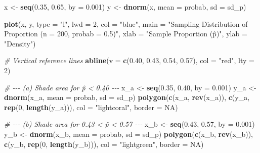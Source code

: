 \documentclass[
]{article}
\newenvironment{Shaded}{\begin{snugshade}}{\end{snugshade}}
\newcommand{\AttributeTok}[1]{\textcolor[rgb]{0.13,0.29,0.53}{#1}}
\newcommand{\CommentTok}[1]{\textcolor[rgb]{0.56,0.35,0.01}{\textit{#1}}}
\newcommand{\ConstantTok}[1]{\textcolor[rgb]{0.56,0.35,0.01}{#1}}
\newcommand{\DecValTok}[1]{\textcolor[rgb]{0.00,0.00,0.81}{#1}}
\newcommand{\FloatTok}[1]{\textcolor[rgb]{0.00,0.00,0.81}{#1}}
\newcommand{\FunctionTok}[1]{\textcolor[rgb]{0.13,0.29,0.53}{\textbf{#1}}}
\newcommand{\NormalTok}[1]{#1}
\newcommand{\OtherTok}[1]{\textcolor[rgb]{0.56,0.35,0.01}{#1}}
\newcommand{\StringTok}[1]{\textcolor[rgb]{0.31,0.60,0.02}{#1}}
\begin{document}
\begin{Shaded}
\begin{Highlighting}[]
\NormalTok{x }\OtherTok{\textless{}{-}} \FunctionTok{seq}\NormalTok{(}\FloatTok{0.35}\NormalTok{, }\FloatTok{0.65}\NormalTok{, }\AttributeTok{by =} \FloatTok{0.001}\NormalTok{)}
\NormalTok{y }\OtherTok{\textless{}{-}} \FunctionTok{dnorm}\NormalTok{(x, }\AttributeTok{mean =}\NormalTok{ probab, }\AttributeTok{sd =}\NormalTok{ sd\_p)}

\FunctionTok{plot}\NormalTok{(x, y, }\AttributeTok{type =} \StringTok{"l"}\NormalTok{, }\AttributeTok{lwd =} \DecValTok{2}\NormalTok{, }\AttributeTok{col =} \StringTok{"blue"}\NormalTok{,}
     \AttributeTok{main =} \StringTok{"Sampling Distribution of Proportion (n = 200, probab = 0.5)"}\NormalTok{,}
     \AttributeTok{xlab =} \StringTok{"Sample Proportion (p̂)"}\NormalTok{,}
     \AttributeTok{ylab =} \StringTok{"Density"}\NormalTok{)}

\CommentTok{\# Vertical reference lines}
\FunctionTok{abline}\NormalTok{(}\AttributeTok{v =} \FunctionTok{c}\NormalTok{(}\FloatTok{0.40}\NormalTok{, }\FloatTok{0.43}\NormalTok{, }\FloatTok{0.54}\NormalTok{, }\FloatTok{0.57}\NormalTok{), }\AttributeTok{col =} \StringTok{"red"}\NormalTok{, }\AttributeTok{lty =} \DecValTok{2}\NormalTok{)}

\CommentTok{\# {-}{-}{-} (a) Shade area for p̂ \textless{} 0.40 {-}{-}{-}}
\NormalTok{x\_a }\OtherTok{\textless{}{-}} \FunctionTok{seq}\NormalTok{(}\FloatTok{0.35}\NormalTok{, }\FloatTok{0.40}\NormalTok{, }\AttributeTok{by =} \FloatTok{0.001}\NormalTok{)}
\NormalTok{y\_a }\OtherTok{\textless{}{-}} \FunctionTok{dnorm}\NormalTok{(x\_a, }\AttributeTok{mean =}\NormalTok{ probab, }\AttributeTok{sd =}\NormalTok{ sd\_p)}
\FunctionTok{polygon}\NormalTok{(}\FunctionTok{c}\NormalTok{(x\_a, }\FunctionTok{rev}\NormalTok{(x\_a)), }\FunctionTok{c}\NormalTok{(y\_a, }\FunctionTok{rep}\NormalTok{(}\DecValTok{0}\NormalTok{, }\FunctionTok{length}\NormalTok{(y\_a))), }\AttributeTok{col =} \StringTok{"lightcoral"}\NormalTok{, }\AttributeTok{border =} \ConstantTok{NA}\NormalTok{)}

\CommentTok{\# {-}{-}{-} (b) Shade area for 0.43 \textless{} p̂ \textless{} 0.57 {-}{-}{-}}
\NormalTok{x\_b }\OtherTok{\textless{}{-}} \FunctionTok{seq}\NormalTok{(}\FloatTok{0.43}\NormalTok{, }\FloatTok{0.57}\NormalTok{, }\AttributeTok{by =} \FloatTok{0.001}\NormalTok{)}
\NormalTok{y\_b }\OtherTok{\textless{}{-}} \FunctionTok{dnorm}\NormalTok{(x\_b, }\AttributeTok{mean =}\NormalTok{ probab, }\AttributeTok{sd =}\NormalTok{ sd\_p)}
\FunctionTok{polygon}\NormalTok{(}\FunctionTok{c}\NormalTok{(x\_b, }\FunctionTok{rev}\NormalTok{(x\_b)), }\FunctionTok{c}\NormalTok{(y\_b, }\FunctionTok{rep}\NormalTok{(}\DecValTok{0}\NormalTok{, }\FunctionTok{length}\NormalTok{(y\_b))), }\AttributeTok{col =} \StringTok{"lightgreen"}\NormalTok{, }\AttributeTok{border =} \ConstantTok{NA}\NormalTok{)}


\end{Highlighting}
\end{Shaded}
\end{document}
